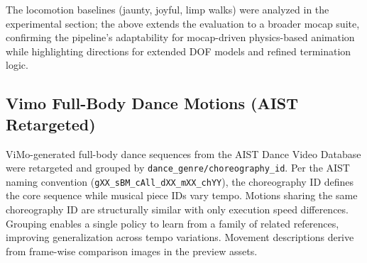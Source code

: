 The locomotion baselines (jaunty, joyful, limp walks) were analyzed in the experimental section; the above extends the evaluation to a broader mocap suite, confirming the pipeline's adaptability for mocap-driven physics-based animation while highlighting directions for extended DOF models and refined termination logic.

\subsection{Vimo Full-Body Dance Motions (AIST Retargeted)}

ViMo-generated full-body dance sequences from the AIST Dance Video Database were retargeted and grouped by \texttt{dance\_genre/choreography\_id}. Per the AIST naming convention (\texttt{gXX\_sBM\_cAll\_dXX\_mXX\_chYY}), the choreography ID defines the core sequence while musical piece IDs vary tempo. Motions sharing the same choreography ID are structurally similar with only execution speed differences. Grouping enables a single policy to learn from a family of related references, improving generalization across tempo variations. Movement descriptions derive from frame-wise comparison images in the preview assets.

\begin{table}[htbp]
\centering
\caption{Vimo dance motion performance at convergence (Period 30). Numerical highlights from training traces directly substantiate inferences on stability, converter artifacts, and partial success.}
\label{tab:vimo_metrics}
\end{table}


